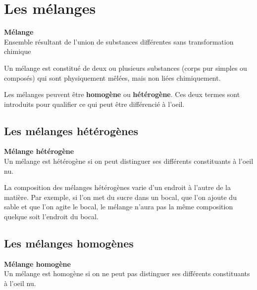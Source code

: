 \documentclass[
  11pt,
  a4paper,
  openany]{book}
\begin{document}
\hypertarget{les-muxe9langes}{%
\section{Les mélanges}\label{les-muxe9langes}}

\begin{tcolorbox}
\textbf{Mélange}\\
Ensemble résultant de l'union de substances différentes sans transformation chimique

\end{tcolorbox}

Un mélange est constitué de deux ou plusieurs substances (corps pur simples ou composés) qui sont physiquement mêlées, mais non liées chimiquement.

Les mélanges peuvent être \textbf{homogène} ou \textbf{hétérogène}. Ces deux termes sont introduits pour qualifier ce qui peut être différencié à l'oeil.

\hypertarget{les-muxe9langes-huxe9tuxe9roguxe8nes}{%
\subsection{Les mélanges hétérogènes}\label{les-muxe9langes-huxe9tuxe9roguxe8nes}}

\begin{tcolorbox}
\textbf{Mélange hétérogène}\\
Un mélange est hétérogène si on peut distinguer ses différents constituants à l'oeil nu.

\end{tcolorbox}

La composition des mélanges hétérogènes varie d'un endroit à l'autre de la matière. Par exemple, si l'on met du sucre dans un bocal, que l'on ajoute du sable et que l'on agite le bocal, le mélange n'aura pas la même composition quelque soit l'endroit du bocal.

\hypertarget{les-muxe9langes-homoguxe8nes}{%
\subsection{Les mélanges homogènes}\label{les-muxe9langes-homoguxe8nes}}

\begin{tcolorbox}
\textbf{Mélange homogène}\\
Un mélange est homogène si on ne peut pas distinguer ses différents constituants à l'oeil nu.

\end{tcolorbox}
\end{document}
